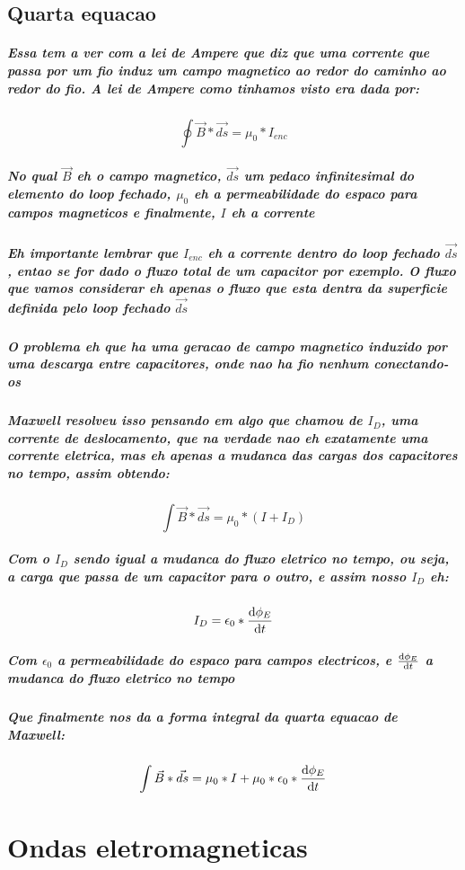 \documentclass[12pt,twoside, a4paper, twocolumn]{article}
\begin{document}
\subsection{Quarta equacao}
\subparagraph*{Essa tem a ver com a lei de Ampere que diz que uma corrente que passa por um fio induz um campo magnetico ao redor do caminho ao redor do fio. A lei de Ampere como tinhamos visto era dada por:}
\begin{equation}
    \oint \vec{B} * \vec{ds} = \mu_0 * I_{enc}
\end{equation}
\subparagraph*{No qual $\vec{B}$ eh o campo magnetico, $\vec{ds}$ um pedaco infinitesimal do elemento do loop fechado, $\mu_0$ eh a permeabilidade do espaco para campos magneticos e finalmente, $I$ eh a corrente}
\subparagraph*{Eh importante lembrar que $I_{enc}$ eh a corrente dentro do loop fechado $\vec{ds}$, entao se for dado o fluxo total de um capacitor por exemplo. O fluxo que vamos considerar eh apenas o fluxo que esta dentra da superficie definida pelo loop fechado $\vec{ds}$}
\subparagraph*{O problema eh que ha uma geracao de campo magnetico induzido por uma descarga entre capacitores, onde nao ha fio nenhum conectando-os}
\subparagraph*{Maxwell resolveu isso pensando em algo que chamou de $I_D$, uma corrente de deslocamento, que na verdade nao eh exatamente uma corrente eletrica, mas eh apenas a mudanca das cargas dos capacitores no tempo, assim obtendo:}
\begin{equation}
    \int \vec{B} * \vec{ds} = \mu_0 * \left(I +I_D\right)
\end{equation}
\subparagraph*{Com o $I_D$ sendo igual a mudanca do fluxo eletrico no tempo, ou seja, a carga que passa de um capacitor para o outro, e assim nosso $I_D$ eh:}
\begin{equation}
    I_D = \epsilon_0 * \frac{\mathrm d \phi_E}{\mathrm d t}
\end{equation}
\subparagraph*{Com $\epsilon_0$ a permeabilidade do espaco para campos electricos, e $\frac{\mathrm d \phi_E}{\mathrm d t}$ a mudanca do fluxo eletrico no tempo}
\subparagraph*{Que finalmente nos da a forma integral da quarta equacao de Maxwell:}
\begin{equation}
    \int \vec{B} * \vec{ds} = \mu_0 * I + \mu_0 * \epsilon_0 * \frac{\mathrm d \phi_E}{\mathrm d t}
\end{equation}

\section{Ondas eletromagneticas}
\end{document}
